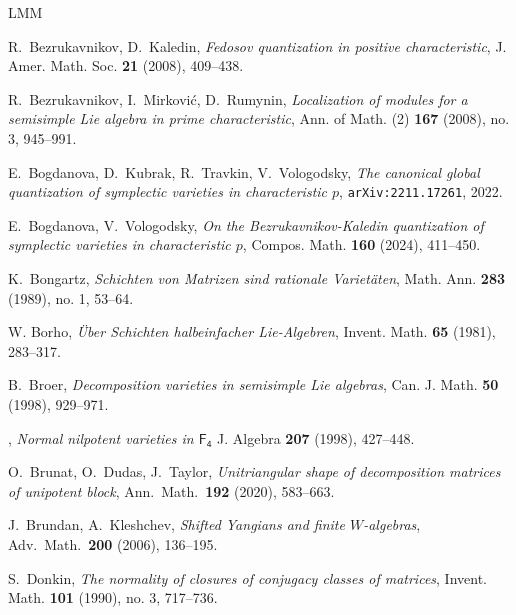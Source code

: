 \documentclass[twoside,12pt,reqno]{amsart}
\theoremstyle{remark}
\numberwithin{equation}{section}
\newcommand{\arxiv}[1]{{\tt arXiv:#1}}
\def\sF{{\mathsf{F_4}}}
\begin{document}
 
 

 
    
	\begin{thebibliography}{LMM}

        R.~Bezrukavnikov, D.~Kaledin, {\em Fedosov quantization in positive characteristic}, J. Amer. Math. Soc. {\bf 21} (2008), 409--438.

        R.~Bezrukavnikov, I.~Mirković, D.~Rumynin,
        {\em Localization of modules for a semisimple Lie algebra in prime characteristic},
        Ann. of Math. (2) {\bf 167} (2008), no. 3, 945--991.

         E.~Bogdanova, 
        D.~Kubrak, R.~Travkin, V.~Vologodsky, {\em The canonical global quantization of symplectic varieties in characteristic $p$}, \arxiv{2211.17261}, 2022.

         E.~Bogdanova, V.~Vologodsky, {\em On the Bezrukavnikov-Kaledin quantization of symplectic varieties in characteristic $p$}, Compos. Math. {\bf 160} (2024), 411--450.

        
         K.~Bongartz,
        {\em Schichten von Matrizen sind rationale Varietäten},
        Math. Ann. {\bf 283} (1989), no. 1, 53--64.
        
        W. Borho,  {\em \"{U}ber Schichten halbeinfacher Lie-Algebren}, Invent. Math. {\bf 65} (1981), 283--317. 



         B.~Broer, {\em Decomposition varieties in semisimple Lie algebras}, Can. J. Math. {\bf 50} (1998), 929--971.

         \bysame, {\em Normal nilpotent varieties in $\sF$} J. Algebra {\bf 207} (1998), 427--448.

         O.~Brunat, O.~Dudas, J.~Taylor, {\em Unitriangular shape of decomposition matrices of unipotent block}, Ann.\ Math.\ {\bf 192} (2020), 583--663.


  

        J.~Brundan, A.~Kleshchev,
        {\em Shifted Yangians and finite $W$-algebras},
        Adv.\ Math.\ {\bf 200} (2006), 136--195.

  
        
        S.~Donkin, {\it The normality of closures of conjugacy classes of matrices}, Invent. Math. {\bf 101} (1990), no. 3, 717--736.


\end{thebibliography}
\end{document}
